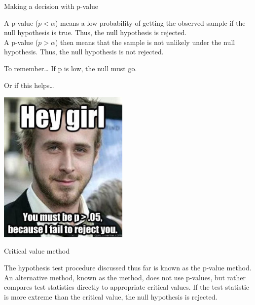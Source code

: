 \documentclass[xcolor=table, handout]{beamer}
\begin{document}
\begin{frame}{Making a decision with p-value}
\begin{block}{}
\large
A  p-value ($p < \alpha$) means a low probability of getting the observed sample if the null hypothesis is true. Thus, the null hypothesis is rejected.\\
\medskip
A  p-value ($p > \alpha$) then means that the sample is not unlikely under the null hypothesis. Thus, the null hypothesis is not rejected.
\end{block}

\pause
\begin{alertblock}{To remember\ldots}
\Large If p is low, the null must go.
\end{alertblock}

\end{frame}

\begin{frame}{Or if this helps\ldots}

{\centering
\includegraphics[width=2.5in]{../images/ch08_p_value_meme}
\par}

\end{frame}

\begin{frame}{Critical value method}
\begin{block}{}
\large
The hypothesis test procedure discussed thus far is known as the p-value method. An alternative method, known as the  method, does not use p-values, but rather compares test statistics directly to appropriate critical values. If the test statistic is more extreme than the critical value, the null hypothesis is rejected.
\end{block}
\end{frame}
\end{document}
